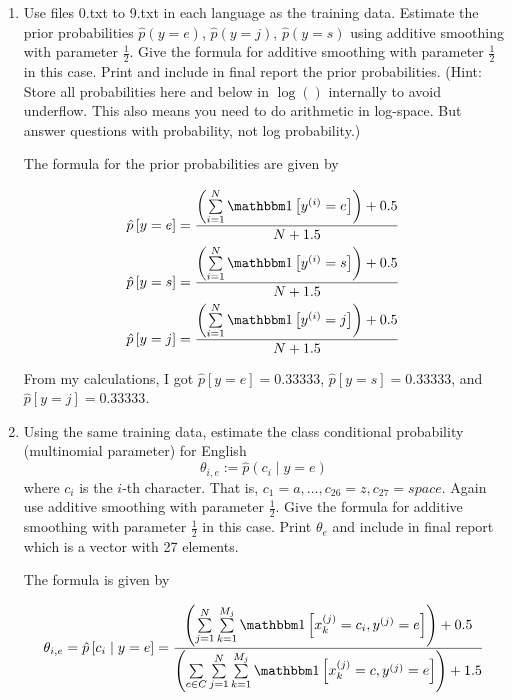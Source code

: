 \documentclass[a4paper]{article}
\theoremstyle{definition}
\def\ind{\mathbbm 1}
\newenvironment{soln}{
    \leavevmode\color{blue}\ignorespaces
}{}
\begin{document}
\begin{enumerate}
\item
Use files 0.txt to 9.txt in each language as the training data.
Estimate the prior probabilities 
$\hat p(y=e)$,
$\hat p(y=j)$,
$\hat p(y=s)$
using additive smoothing with parameter $\frac{1}{2}$. 
Give the formula for additive smoothing with parameter $\frac{1}{2}$ in this case. 
Print and include in final report the prior probabilities.
(Hint: Store all probabilities here and below in $\log()$ internally to avoid underflow. This also means you need to do arithmetic in log-space.  But answer questions with probability, not log probability.)

\begin{soln}
    The formula for the prior probabilities are given by

    \begin{align*}
        \hat{p} \left[ y = e \right] &= \frac{\left( \sum\limits_{i=1}^{N} \ind \left[ y^{(i)} = e \right] \right) + 0.5}{N + 1.5} \\
        \hat{p} \left[ y = s \right] &= \frac{\left( \sum\limits_{i=1}^{N} \ind \left[ y^{(i)} = s \right] \right) + 0.5 }{N + 1.5} \\
        \hat{p} \left[ y = j \right] &= \frac{\left( \sum\limits_{i=1}^{N} \ind \left[ y^{(i)} = j \right] \right) + 0.5 }{N + 1.5}
    \end{align*}

    From my calculations, I got $\hat{p} \left[ y = e \right] = 0.33333$, $\hat{p} \left[ y = s \right] = 0.33333$, and $\hat{p} \left[ y = j \right] = 0.33333$.
\end{soln}

\pagebreak
\item
Using the same training data, estimate the class conditional probability (multinomial parameter) for English
$$\theta_{i,e} := \hat p(c_i \mid y=e)$$ 
where $c_i$ is the $i$-th character. That is, $c_1 = a, \ldots, c_{26} = z, c_{27} = space$.
Again use additive smoothing with parameter $\frac{1}{2}$.
Give the formula for additive smoothing with parameter $\frac{1}{2}$ in this case. 
Print $\theta_e$ and include in final report which is a vector with 27 elements.

\begin{soln}
    The formula is given by

    \begin{equation*}
        \theta_{i, e} = \hat{p} \left[ c_i \mid y = e \right] = \frac{\left( \sum\limits_{j=1}^{N} \sum\limits_{k = 1}^{M_j} \ind \left[ x_k^{(j)} = c_i, y^{(j)} = e \right] \right) + 0.5}{\left( \sum\limits_{c \in C} \sum\limits_{j=1}^{N} \sum\limits_{k = 1}^{M_j} \ind \left[ x_k^{(j)} = c, y^{(j)} = e \right] \right) + 1.5}
    \end{equation*}


\end{soln}
\end{enumerate}
\end{document}
